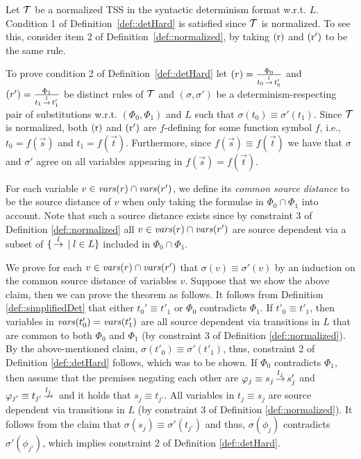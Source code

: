 Let $\mathcal{T}$ be a normalized TSS in the syntactic determinism format w.r.t. $L$.
Condition 1
of Definition~\ref{def::detHard} is satisfied since $\mathcal{T}$ is normalized. To
see this, consider item 2 of Definition~\ref{def::normalized}, by taking $\mathrm{(r)}$ and $\mathrm{(r')}$ to be the same rule.

To prove condition 2 of Definition~\ref{def::detHard}
let $(r) = \frac{\Phi_0}{t_0\,{\stackrel{{l}}{\rightarrow}}\,t_0'}$ and
$(r') = \frac{\Phi_1}{t_1\,{\stackrel{{l}}{\rightarrow}}\,t_1'}$ be distinct rules of $\mathcal{T}$ and $(\sigma,\sigma')$
be a determinism-respecting pair of substitutions w.r.t. $(\Phi_0, \Phi_1)$ and $L$
such that $\sigma(t_0) \equiv \sigma'(t_1)$. Since $\mathcal{T}$ is normalized,
both $\mathrm{(r)}$ and $\mathrm{(r')}$ are $f$-defining for some function symbol $f$, i.e., $t_0 = f(\overrightarrow{s})$
and $t_1 = f(\overrightarrow{t})$.
Furthermore, since $f(\overrightarrow{s}) \equiv f(\overrightarrow{t})$ we have that
$\sigma$ and $\sigma'$
agree on all variables appearing
in $f(\overrightarrow{s}) = f(\overrightarrow{t})$.

For each variable $v \in \mathit{vars}(r) \cap \mathit{vars}(r')$, we define
its {\em common source distance} to be the source distance of $v$
when only taking the formulae in $\Phi_0 \cap \Phi_1$ into account.
Note that such a source distance exists since by constraint 3 of Definition \ref{def::normalized}
all $v \in \mathit{vars}(r) \cap \mathit{vars}(r')$ are source dependent via a subset of $\{ \,{\stackrel{{l}}{\rightarrow}}\, \mid l \in  L\}$ included in $\Phi_0 \cap \Phi_1$.

We prove for each $v \in \mathit{vars}(r) \cap \mathit{vars}(r')$ that $\sigma(v) \equiv \sigma'(v)$ by
an induction on the common source distance of variables $v$.
Suppose that we show the above claim, then we can prove the theorem as follows.
It follows from Definition \ref{def::simplifiedDet} that either $t_0' \equiv t'_1$ or $\Phi_0$ contradicts $\Phi_1$.
If $t'_0 \equiv t'_1$, then variables in $\mathit{vars}(t'_0) = \mathit{vars}(t'_1)$ are all source dependent via transitions in $L$
that are common to both $\Phi_0$ and $\Phi_1$
(by constraint 3 of Definition \ref{def::normalized}).
By the above-mentioned claim, $\sigma(t'_0) \equiv \sigma'(t'_1)$, thus, constraint 2 of Definition \ref{def::detHard} follows, which was to be shown.
If  $\Phi_0$ contradicts $\Phi_1$, then assume that the premises negating each other are $\varphi_j \equiv s_j \,{\stackrel{{l_j}}{\rightarrow}}\, s'_j$ and $\varphi_{j'} \equiv t_{j'} \,{\stackrel{{l_j}}{\nrightarrow}}\,$ and it holds that $s_j \equiv t_{j'}$.
All variables in $t_j \equiv s_j$ are source dependent via transitions in $L$ (by constraint 3   of Definition \ref{def::normalized}).
It follows from the claim that $\sigma(s_j) \equiv \sigma'(t_{j'})$
and thus, $\sigma(\phi_j)$ contradicts $\sigma'(\phi_{j'})$, which implies constraint 2 of Definition \ref{def::detHard}.


